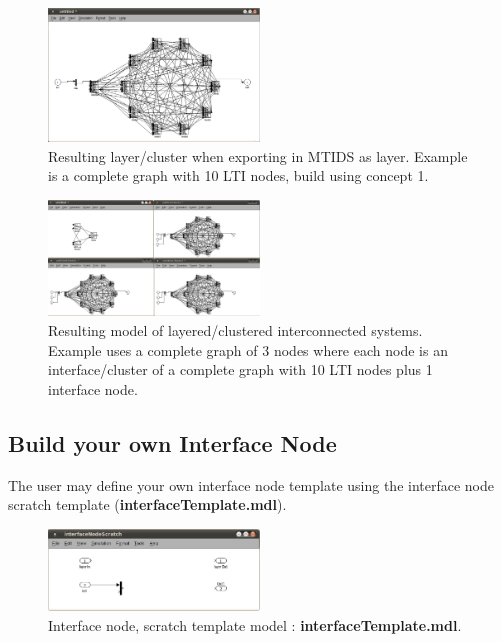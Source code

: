 \documentclass[a4paper,twoside, openright,12pt]{report}
\begin{document}
\begin{figure}[htb]
\centering
\includegraphics[width=0.5\textwidth]{pics/screenLayer.eps}
\caption[MTIDS export as layer resulting model]{Resulting layer/cluster when exporting in MTIDS as layer. Example is a complete graph with 10 LTI nodes, build using concept 1.}
\label{layerFig}
\end{figure}



\begin{figure}[htb]
\centering
\includegraphics[width=0.5\textwidth]{pics/screenLayers.eps}
\caption[MTIDS model of layered/clustered interconnected systems]{Resulting model of layered/clustered interconnected systems. Example uses a complete graph of 3 nodes where each node is an interface/cluster of a complete graph with 10 LTI nodes plus 1 interface node.}
\label{layersFig}
\end{figure}




\subsection{Build your own Interface Node}

The user may define your own interface node template using the interface node scratch template (\textbf{interfaceTemplate.mdl}). \\

\begin{figure}[htb]
\centering
\includegraphics[width=0.5\textwidth]{pics/interfaceTemplate.eps}
\caption[MTIDS interface node scratch template]{Interface node, scratch template model : \textbf{interfaceTemplate.mdl}.}
\label{interfaceFig}
\end{figure}
 
\end{document}
